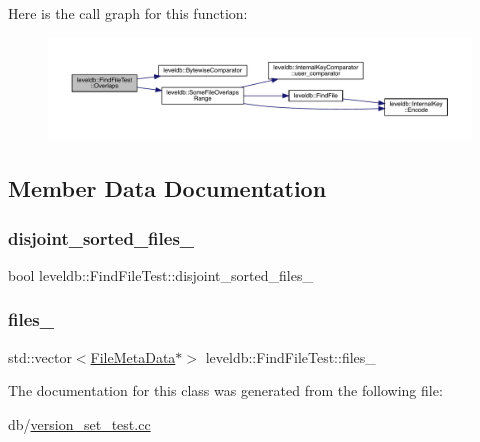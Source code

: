 Here is the call graph for this function\+:
\nopagebreak
\begin{figure}[H]
\begin{center}
\leavevmode
\includegraphics[width=350pt]{classleveldb_1_1_find_file_test_a617e51dc2e6acbe7d5bc6d0a7224ac51_cgraph}
\end{center}
\end{figure}


\subsection{Member Data Documentation}
\mbox{\label{classleveldb_1_1_find_file_test_acf50512be17b9a3cd96388a8c837b8e0}} 
\subsubsection{\texorpdfstring{disjoint\_sorted\_files\_}{disjoint\_sorted\_files\_}}
{\footnotesize\ttfamily bool leveldb\+::\+Find\+File\+Test\+::disjoint\+\_\+sorted\+\_\+files\+\_\+}

\mbox{\label{classleveldb_1_1_find_file_test_a53b61e6b01283c235fae219013b0e2c7}} 
\subsubsection{\texorpdfstring{files\_}{files\_}}
{\footnotesize\ttfamily std\+::vector$<$\mbox{\hyperlink{structleveldb_1_1_file_meta_data}{File\+Meta\+Data}}$\ast$$>$ leveldb\+::\+Find\+File\+Test\+::files\+\_\+}



The documentation for this class was generated from the following file\+:\begin{DoxyCompactItemize}
\item 
db/\mbox{\hyperlink{version__set__test_8cc}{version\+\_\+set\+\_\+test.\+cc}}\end{DoxyCompactItemize}

